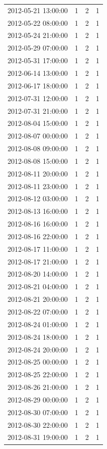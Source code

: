 \begin{tabular}{lrrr}
2012-05-21 13:00:00 & 1 & 2 & 1 \\
2012-05-22 08:00:00 & 1 & 2 & 1 \\
2012-05-24 21:00:00 & 1 & 2 & 1 \\
2012-05-29 07:00:00 & 1 & 2 & 1 \\
2012-05-31 17:00:00 & 1 & 2 & 1 \\
2012-06-14 13:00:00 & 1 & 2 & 1 \\
2012-06-17 18:00:00 & 1 & 2 & 1 \\
2012-07-31 12:00:00 & 1 & 2 & 1 \\
2012-07-31 21:00:00 & 1 & 2 & 1 \\
2012-08-04 15:00:00 & 1 & 2 & 1 \\
2012-08-07 00:00:00 & 1 & 2 & 1 \\
2012-08-08 09:00:00 & 1 & 2 & 1 \\
2012-08-08 15:00:00 & 1 & 2 & 1 \\
2012-08-11 20:00:00 & 1 & 2 & 1 \\
2012-08-11 23:00:00 & 1 & 2 & 1 \\
2012-08-12 03:00:00 & 1 & 2 & 1 \\
2012-08-13 16:00:00 & 1 & 2 & 1 \\
2012-08-16 16:00:00 & 1 & 2 & 1 \\
2012-08-16 22:00:00 & 1 & 2 & 1 \\
2012-08-17 11:00:00 & 1 & 2 & 1 \\
2012-08-17 21:00:00 & 1 & 2 & 1 \\
2012-08-20 14:00:00 & 1 & 2 & 1 \\
2012-08-21 04:00:00 & 1 & 2 & 1 \\
2012-08-21 20:00:00 & 1 & 2 & 1 \\
2012-08-22 07:00:00 & 1 & 2 & 1 \\
2012-08-24 01:00:00 & 1 & 2 & 1 \\
2012-08-24 18:00:00 & 1 & 2 & 1 \\
2012-08-24 20:00:00 & 1 & 2 & 1 \\
2012-08-25 00:00:00 & 1 & 2 & 1 \\
2012-08-25 22:00:00 & 1 & 2 & 1 \\
2012-08-26 21:00:00 & 1 & 2 & 1 \\
2012-08-29 00:00:00 & 1 & 2 & 1 \\
2012-08-30 07:00:00 & 1 & 2 & 1 \\
2012-08-30 22:00:00 & 1 & 2 & 1 \\
2012-08-31 19:00:00 & 1 & 2 & 1 \\

\end{tabular}
